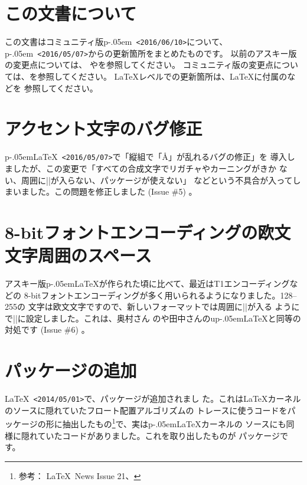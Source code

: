 \documentclass{plnews}
\author{日本語\TeX{}開発コミュニティ（\texttt{https://texjp.org/}）}
\def\pLaTeX{p\kern-.05em\LaTeX}
\def\pLaTeXe{p\kern-.05em\LaTeXe}
\begin{document}
\maketitle

\section{この文書について}
この文書はコミュニティ版\pLaTeXe\ \texttt{<2016/06/10>}について、
\pLaTeXe\ \texttt{<2016/05/07>}からの更新箇所をまとめたものです。
以前のアスキー版の変更点については、
やを参照してください。
コミュニティ版の変更点については、を参照してください。
\LaTeX{}レベルでの更新箇所は、\LaTeX{}に付属のなどを
参照してください。


\section{アクセント文字のバグ修正}
\pLaTeX\ \texttt{<2016/05/07>}で「縦組で「\AA{}」が乱れるバグの修正」を
導入しましたが、この変更で「すべての合成文字でリガチャやカーニングがきか
ない、周囲に|\xkanjiskip|が入らない、パッケージが使えない」
などという不具合が入ってしまいました。この問題を修正しました (Issue \#5) 。


\section{8-bitフォントエンコーディングの欧文文字周囲のスペース}
アスキー版\pLaTeX{}が作られた頃に比べて、最近はT1エンコーディングなどの
8-bitフォントエンコーディングが多く用いられるようになりました。128--255の
文字は欧文文字ですので、新しいフォーマットでは周囲に|\xkanjiskip|が入る
ようにで||に設定しました。これは、奥村さん
のや田中さんのu\pLaTeX{}と同等の対処です (Issue \#6) 。


\section{パッケージの追加}
\LaTeX\ \texttt{<2014/05/01>}で、パッケージが追加されまし
た。これは\LaTeX{}カーネルのソースに隠れていたフロート配置アルゴリズムの
トレースに使うコードをパッケージの形に抽出したもの\footnote{参考：
\LaTeX\ News Issue 21、}で、実は\pLaTeX{}カーネルの
ソースにも同様に隠れていたコードがありました。これを取り出したものが
パッケージです。
\end{document}
